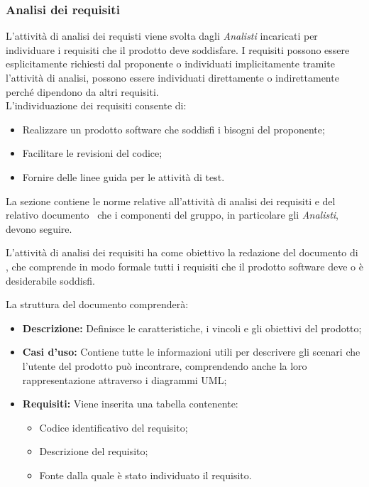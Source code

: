 \subsubsection{Analisi dei requisiti}
L'attività di analisi dei requisti viene svolta dagli \textit{Analisti} incaricati per individuare i requisiti che il prodotto deve soddisfare.
I requisiti possono essere esplicitamente richiesti dal proponente o individuati implicitamente tramite l'attività di analisi, possono essere individuati direttamente o indirettamente perché dipendono da altri requisiti. \\
L'individuazione dei requisiti consente di:
\begin{itemize}
	\item Realizzare un prodotto software che soddisfi i bisogni del proponente;
	\item Facilitare le revisioni del codice;
	\item Fornire delle linee guida per le attività di test.
\end{itemize}

La sezione contiene le norme relative all'attività di analisi dei requisiti e del relativo documento \AdRv\ che i componenti del gruppo, in particolare gli \textit{Analisti}, devono seguire.

L'attività di analisi dei requisiti ha come obiettivo la redazione del documento di \AdRv, che comprende in modo formale tutti i requisiti che il prodotto software deve o è desiderabile soddisfi.

La struttura del documento comprenderà:
\begin{itemize}
	\item \textbf{Descrizione:} Definisce le caratteristiche, i vincoli e gli obiettivi del prodotto;
	\item \textbf{Casi d'uso:} Contiene tutte le informazioni utili per descrivere gli scenari che l'utente del prodotto può incontrare, comprendendo anche la loro rappresentazione attraverso i diagrammi UML;
	\item \textbf{Requisiti:} Viene inserita una tabella contenente:
	\begin{itemize}
		\item Codice identificativo del requisito;
		\item Descrizione del requisito;
		\item Fonte dalla quale è stato individuato il requisito. 
	\end{itemize} 
\end{itemize}

